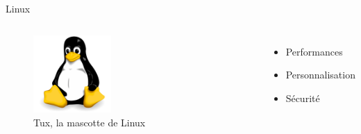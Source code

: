 \documentclass[aspectratio=169,xcolor=dvipsnames]{beamer}
\begin{document}
\begin{frame}{Linux}
    \begin{columns}[c] %

        \begin{figure}
            \includegraphics[width=0.4\textwidth]{1/tux.png}
            \captionsetup{labelformat=empty}
            \caption{Tux, la mascotte de Linux}
        \end{figure}

        \begin{itemize}
            \item Performances
            \item Personnalisation
            \item Sécurité
        \end{itemize}

    \end{columns}
\end{frame}

\end{document}
